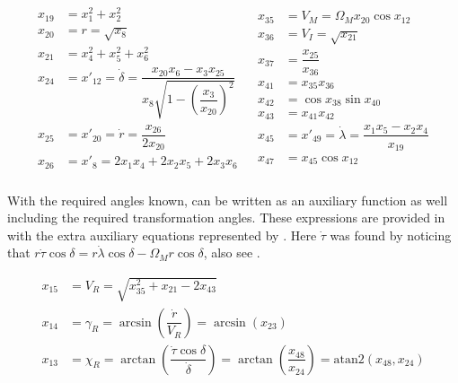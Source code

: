  \begin{align} \label{eq:extraTransAnglAux}
\begin{split}
x_{19} &= x_{1}^{2}+x_{2}^{2}\\
x_{20} &= r = \sqrt{x_{8}} \\
x_{21} &= x_{4}^{2}+x_{5}^{2}+x_{6}^{2}\\
x_{24} &= x'_{12} = \dot{\delta} = \dfrac{x_{20}x_{6}-x_{3}x_{25}}{x_{8} \sqrt{1-\left(\dfrac{x_{3}}{x_{20}}\right)^{2}}}\\
x_{25} &= x'_{20}=\dot{r}=\dfrac{x_{26}}{2x_{20}}\\
x_{26} &= x'_{8}=2x_{1}x_{4}+2x_{2}x_{5}+2x_{3}x_{6}\\
\end{split}
&
\begin{split}
x_{35} &= V_{M} = \Omega_{M} x_{20}\cos x_{12}\\
x_{36} &= V_{I} = \sqrt{x_{21}}\\
x_{37} &= \dfrac{x_{25}}{x_{36}}\\
x_{41} &= x_{35}x_{36}\\
x_{42} &= \cos x_{38} \sin x_{40}\\
x_{43} &= x_{41}x_{42}\\
x_{45} &= x'_{49} = \dot{\lambda} = \dfrac{x_{1}x_{5}-x_{2}x_{4}}{x_{19}}\\
x_{47} &= x_{45} \cos x_{12} \\
\end{split}
\end{align}  

With the required angles known,  can be written as an auxiliary function as well including the required transformation angles. These expressions are provided in  with the extra auxiliary equations represented by . Here $\dot{\tau}$ was found by noticing that $r\dot{\tau}\cos \delta=r\dot{\lambda}\cos \delta-\Omega_{M}r\cos \delta$, also see .

 \begin{equation} \label{eq:rotTransAnglAux}
\begin{split}
x_{15} &= V_{R} = \sqrt{x_{35}^{2}+x_{21}-2x_{43}}\\
x_{14} &= \gamma_{R} = \arcsin\left(\dfrac{\dot{r}}{V_{R}}\right) = \arcsin\left(x_{23}\right)\\
x_{13} &= \chi_{R} = \arctan\left(\dfrac{\dot{\tau}\cos \delta}{\dot{\delta}}\right)=\arctan\left(\dfrac{x_{48}}{x_{24}}\right)=\text{atan2}\left(x_{48},x_{24}\right)\\
\end{split}
\end{equation} 


